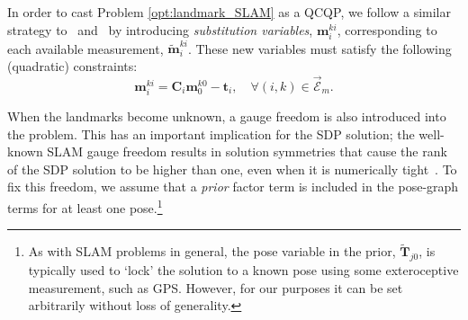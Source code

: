 \documentclass[lettersize,journal]{IEEEtran}
\newcommand{\EdgeSet}{\vec{\bm{\mathcal{E}}}}
\begin{document}
In order to cast Problem \eqref{opt:landmark_SLAM} as a QCQP, we follow a similar strategy to~\cite{dumbgenSafeSmoothCertified2023} and~\cite{brialesCertifiablyGloballyOptimal2018} by introducing \textit{substitution variables}, $ \bm{m}_i^{ki} $, corresponding to each available measurement, $ \tilde{\bm{m}}_i^{ki} $. These new variables must satisfy the following (quadratic) constraints:
\begin{equation}
	\bm{m}_i^{ki} = \bm{C}_i\bm{m}_0^{k0} - \bm{t}_i, \quad \forall (i,k)\in\EdgeSet_m.
\end{equation}

When the landmarks become unknown, a gauge freedom is also introduced into the problem. This has an important implication for the SDP solution; the well-known SLAM gauge freedom results in solution symmetries that cause the rank of the SDP solution to be higher than one, even when it is numerically tight~\cite{brialesCertifiablyGloballyOptimal2018}. To fix this freedom, we assume that a \emph{prior} factor term is included in the pose-graph terms for at least one pose.\footnote{As with SLAM problems in general, the pose variable in the prior, $\tilde{\bm{T}}_{j0}$, is typically used to `lock' the solution to a known pose using some exteroceptive measurement, such as GPS. However, for our purposes it can be set arbitrarily without loss of generality.}
\end{document}
